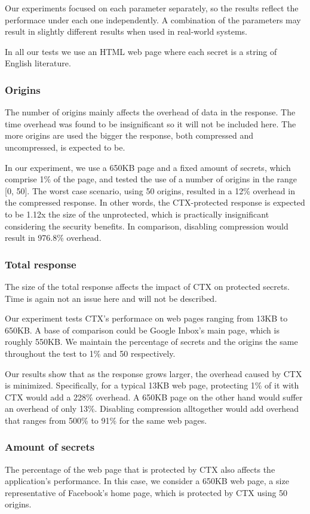 \documentclass[a4paper, 11 pt, conference]{article}  %
\begin{document}
Our experiments focused on each parameter separately, so the results reflect the
performace under each one independently. A combination of the parameters may
result in slightly different results when used in real-world systems.

In all our tests we use an HTML web page where each secret is a string of
English literature.

\subsubsection{Origins}
The number of origins mainly affects the overhead of data in the response. The
time overhead was found to be insignificant so it will not be included here. The
more origins are used the bigger the response, both compressed and uncompressed,
is expected to be.

In our experiment, we use a 650KB page and a fixed amount of secrets, which
comprise 1\% of the page, and tested the use of a number of origins in the range
[0, 50]. The worst case scenario, using 50 origins, resulted in a 12\% overhead
in the compressed response. In other words, the CTX-protected response is
expected to be 1.12x the size of the unprotected, which is practically
insignificant considering the security benefits. In comparison, disabling
compression would result in 976.8\% overhead.

\subsubsection{Total response}
The size of the total response affects the impact of CTX on protected secrets.
Time is again not an issue here and will not be described.

Our experiment tests CTX's performace on web pages ranging from 13KB to 650KB.
A base of comparison could be Google Inbox's main page, which is roughly 550KB.
We maintain the percentage of secrets and the origins the same throughout the
test to 1\% and 50 respectively.

Our results show that as the response grows larger, the overhead caused by CTX
is minimized. Specifically, for a typical 13KB web page, protecting 1\% of it
with CTX would add a 228\% overhead. A 650KB page on the other
hand would suffer an overhead of only 13\%. Disabling compression alltogether
would add overhead that ranges from 500\% to 91\% for the same web pages.

\subsubsection{Amount of secrets}
The percentage of the web page that is protected by CTX also affects the
application's performance. In this case, we consider a 650KB web page, a size
representative of Facebook's home page, which is protected by CTX using 50
origins.
\end{document}
